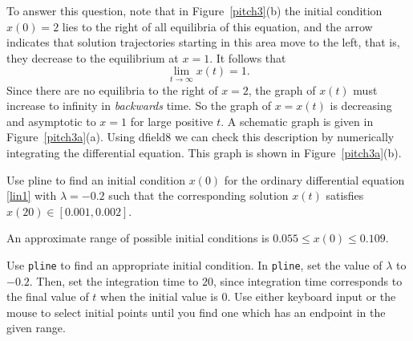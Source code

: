 \documentclass{ximera}
\begin{document}
To answer this question, note that in Figure~\ref{pitch3}(b) the
initial condition $x(0)=2$ lies to the right of all equilibria of
this equation, and the arrow indicates that solution trajectories
starting in this area move to the left, that is, they decrease to
the equilibrium at $x=1$.  It follows that
\[
\lim_{t\to\infty} x(t) = 1.
\]
Since there are no equilibria to the right of $x=2$, the graph of $x(t)$
must increase to infinity in {\em backwards\/} time.  So the graph of 
$x=x(t)$ is decreasing and asymptotic to $x=1$ for large positive $t$.  
A schematic graph is given in Figure~\ref{pitch3a}(a).  Using {\sf dfield8} 
we can check this description by numerically integrating the differential
equation.   This graph is shown in Figure~\ref{pitch3a}(b).

\begin{figure*}[htb]
       \centerline{%
	}
       \caption{Time series for solution to $\dot{x}=x(1-x^2)$ with $x(0)=2$.
	(Left) Sketch using asymptotic information; (right) {\sf dfield8}
	computation.}
       \label{pitch3a}
\end{figure*}



\EXER

\CEXER

\begin{exercise} \label{c3.3.1}
Use {\sf pline} to find an initial condition $x(0)$ for the
ordinary differential equation \eqref{lin1} with $\lambda=-0.2$
such that the corresponding solution $x(t)$ satisfies
$x(20)\in[0.001,0.002]$.

\begin{solution}

\ans An approximate range of possible initial conditions is
$0.055 \leq x(0) \leq 0.109$. 

\soln Use {\tt pline} to find an appropriate initial condition.
In {\tt pline}, set the value of $\lambda$ to $-0.2$.  Then, set the
integration time to $20$, since integration time corresponds to the
final value of $t$ when the initial value is $0$.  Use either
keyboard input or the mouse to select initial points until you
find one which has an endpoint in the given range. 

\end{solution}
\end{exercise}
\end{document}
